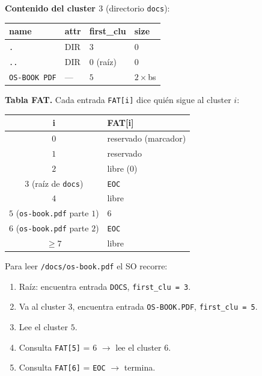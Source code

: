 \documentclass[11pt,a4paper]{article}
\begin{document}
\textbf{Contenido del cluster $3$} (directorio \texttt{docs}):

\begin{center}
\small
\begin{tabular}{@{}llll@{}}
\toprule
name & attr & first\_clu & size \\
\midrule
\texttt{.}            & DIR & $3$ & $0$       \\
\texttt{..}           & DIR & $0$ (raíz)  & $0$       \\
\texttt{OS-BOOK PDF}  & --- & $5$ & $2 \times $bs \\
\bottomrule
\end{tabular}
\end{center}

\textbf{Tabla FAT.} Cada entrada \texttt{FAT[i]} dice quién sigue al
cluster $i$:

\begin{center}
\small
\begin{tabular}{@{}cl@{}}
\toprule
i & FAT[i] \\
\midrule
$0$ & reservado (marcador) \\
$1$ & reservado \\
$2$ & libre ($0$) \\
$3$ (raíz de \texttt{docs}) & \texttt{EOC} \\
$4$ & libre \\
$5$ (\texttt{os-book.pdf} parte $1$) & $6$ \\
$6$ (\texttt{os-book.pdf} parte $2$) & \texttt{EOC} \\
$\geq 7$ & libre \\
\bottomrule
\end{tabular}
\end{center}

\begin{idea}
Para leer \texttt{/docs/os-book.pdf} el SO recorre:

\begin{enumerate}[leftmargin=*,nosep,label=(\arabic*)]
    \item Raíz: encuentra entrada \texttt{DOCS}, \texttt{first\_clu = 3}.
    \item Va al cluster $3$, encuentra entrada
        \texttt{OS-BOOK.PDF}, \texttt{first\_clu = 5}.
    \item Lee el cluster $5$.
    \item Consulta \texttt{FAT[5]} = $6$ $\to$ lee el cluster $6$.
    \item Consulta \texttt{FAT[6]} = \texttt{EOC} $\to$ termina.
\end{enumerate}
\end{idea}
\end{document}
